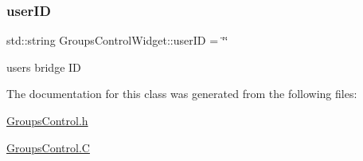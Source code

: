 \subsubsection{\texorpdfstring{user\+ID}{userID}}
{\footnotesize\ttfamily std\+::string Groups\+Control\+Widget\+::user\+ID = \char`\"{}\char`\"{}\hspace{0.3cm}{\ttfamily [private]}}

user\textquotesingle{}s bridge ID 

The documentation for this class was generated from the following files\+:\begin{DoxyCompactItemize}
\item 
\hyperlink{_groups_control_8h}{Groups\+Control.\+h}\item 
\hyperlink{_groups_control_8_c}{Groups\+Control.\+C}\end{DoxyCompactItemize}
